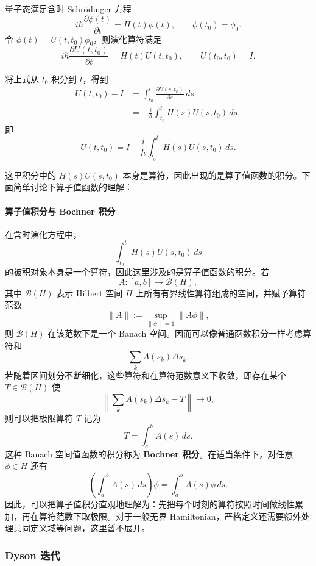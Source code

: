 \documentclass[UTF8,a4paper,11pt,openany]{ctexbook}
\begin{document}
量子态满足含时 Schrödinger 方程
\begin{equation}
    i\hbar\frac{\partial\phi(t)}{\partial t}
    =
    H(t)\phi(t),
    \qquad
    \phi(t_0)=\phi_0.
\end{equation}
令
$\phi(t)=U(t,t_0)\phi_0$，则演化算符满足
\begin{equation}
    i\hbar\frac{\partial U(t,t_0)}{\partial t}
    =
    H(t)U(t,t_0),
    \qquad
    U(t_0,t_0)=I.
\end{equation}

将上式从 $t_0$ 积分到 $t$，得到
\begin{align}
    U(t,t_0)-I
    &=
    \int_{t_0}^{t}
    \frac{\partial U(s,t_0)}{\partial s}\,ds
    \nonumber\\
    &=
    -\frac{i}{\hbar}
    \int_{t_0}^{t}
    H(s)U(s,t_0)\,ds,
\end{align}
即
\begin{equation}
    U(t,t_0)
    =
    I-\frac{i}{\hbar}
    \int_{t_0}^{t}
    H(s)U(s,t_0)\,ds.
\end{equation}

这里积分中的 $H(s)U(s,t_0)$ 本身是算符，因此出现的是算子值函数的积分。下面简单讨论下算子值函数的理解：
\paragraph{算子值积分与 Bochner 积分}

在含时演化方程中，
\[
\int_{t_0}^{t}H(s)U(s,t_0)\,ds
\]
的被积对象本身是一个算符，因此这里涉及的是算子值函数的积分。若
\[
A:[a,b]\to\mathcal B(H),
\]
其中 $\mathcal B(H)$ 表示 Hilbert 空间 $H$ 上所有有界线性算符组成的空间，并赋予算符范数
\begin{equation}
    \|A\|
    :=
    \sup_{\|\phi\|=1}\|A\phi\|,
\end{equation}
则 $\mathcal B(H)$ 在该范数下是一个 Banach 空间。因而可以像普通函数积分一样考虑算符和
\[
\sum_k A(s_k)\Delta s_k.
\]
若随着区间划分不断细化，这些算符和在算符范数意义下收敛，即存在某个
$T\in\mathcal B(H)$ 使
\[
\left\|
\sum_k A(s_k)\Delta s_k-T
\right\|
\to0,
\]
则可以把极限算符 $T$ 记为
\[
T=\int_a^bA(s)\,ds.
\]
这种 Banach 空间值函数的积分称为 \textbf{Bochner 积分}。在适当条件下，对任意
$\phi\in H$ 还有
\[
\left(\int_a^bA(s)\,ds\right)\phi
=
\int_a^bA(s)\phi\,ds.
\]
因此，可以把算子值积分直观地理解为：先把每个时刻的算符按照时间做线性累加，再在算符范数下取极限。对于一般无界 Hamiltonian，严格定义还需要额外处理共同定义域等问题，这里暂不展开。

\subsubsection*{Dyson 迭代}
\end{document}
